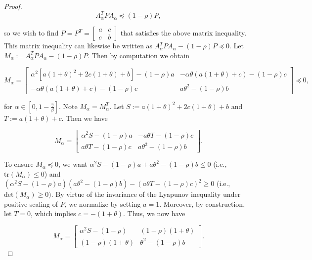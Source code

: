 \documentclass[twoside,11pt]{article}
\begin{document}
\begin{proof}
\begin{equation}
A_{\alpha}^TPA_{\alpha} \preceq (1-\rho)P,
\end{equation}

\noindent
so we wish to find $P = P^T = \begin{bmatrix}
    a & c \\
    c & b
\end{bmatrix}$ that satisfies the above matrix inequality. This matrix inequality can likewise be written as $A_{\alpha}^TPA_{\alpha}-(1-\rho)P \preceq 0$. Let $M_{\alpha} := A_{\alpha}^TPA_{\alpha}-(1-\rho)P$. Then by computation we obtain

\begin{equation}
M_{\alpha} = \begin{bmatrix}
    \alpha^2[a(1+\theta)^2+2c(1+\theta)+b]-(1-\rho)a & -\alpha\theta(a(1+\theta)+c)-(1-\rho)c \\
    -\alpha\theta(a(1+\theta)+c)-(1-\rho)c & a\theta^2-(1-\rho)b
\end{bmatrix} \preceq 0,
\end{equation}

\noindent
for $\alpha \in [0, 1 - \frac{\gamma}{\beta}]$. Note $M_{\alpha} = M_{\alpha}^T$. Let $S:= a(1+\theta)^2+2c(1+\theta)+b$ and $T := a(1+\theta)+c$. Then we have

\begin{equation}
M_{\alpha} = \begin{bmatrix}
    \alpha^2S-(1-\rho)a & -a\theta T - (1-\rho)c \\
    a\theta T - (1-\rho)c & a\theta^2-(1-\rho)b
\end{bmatrix}.
\end{equation}

\noindent
To ensure $M_{\alpha} \preceq 0$, we want $\alpha^2S-(1-\rho)a + a\theta^2-(1-\rho)b \leq 0$ (i.e., $\text{tr}(M_{\alpha}) \leq 0$) and $(\alpha^2S-(1-\rho)a)(a\theta^2-(1-\rho)b) - (a\theta T - (1-\rho)c)^2 \geq 0$ (i.e., $\text{det}(M_{\alpha}) \geq 0)$. By virtue of the invariance of the Lyapunov inequality under positive scaling of $P$, we normalize by setting $a=1$. Moreover, by construction, let $T=0$, which implies $c = -(1+\theta)$. Thus, we now have

\begin{equation}
M_{\alpha} = \begin{bmatrix}
    \alpha^2S-(1-\rho) & (1-\rho)(1+\theta) \\
    (1-\rho)(1+\theta) & \theta^2-(1-\rho)b
\end{bmatrix}.
\end{equation}


\end{proof}
\end{document}
